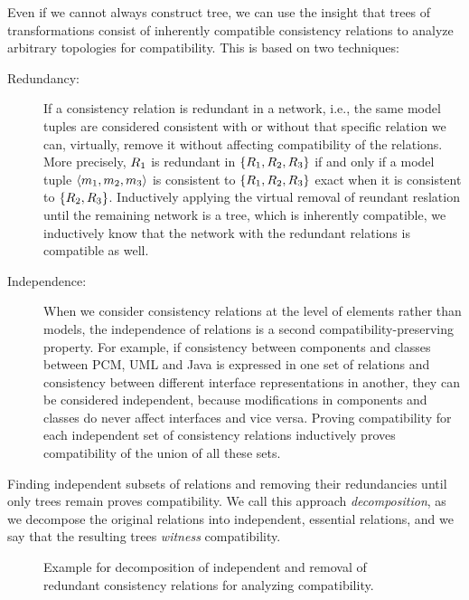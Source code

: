 Even if we cannot always construct tree, we can use the insight that trees of transformations consist of inherently compatible consistency relations to analyze arbitrary topologies for compatibility.
This is based on two techniques:
\begin{description}
    \item[Redundancy:] If a consistency relation is redundant in a network, i.e., the same model tuples are considered consistent with or without that specific relation we can, virtually, remove it without affecting compatibility of the relations. More precisely, $R_{1}$ is redundant in $\{ R_{1}, R_{2}, R_{3} \}$ if and only if a model tuple $\langle m_{1}, m_{2}, m_{3} \rangle$ is consistent to $\{ R_{1}, R_{2}, R_{3} \}$ exact when it is consistent to $\{ R_{2}, R_{3} \}$.
    Inductively applying the virtual removal of reundant reslation until the remaining network is a tree, which is inherently compatible, we inductively know that the network with the redundant relations is compatible as well.
    \item[Independence:] When we consider consistency relations at the level of elements rather than models, the independence of relations is a second compatibility-preserving property.
    For example, if consistency between components and classes between \gls{PCM}, UML and Java is expressed in one set of relations and consistency between different interface representations in another, they can be considered independent, because modifications in components and classes do never affect interfaces and vice versa.
    Proving compatibility for each independent set of consistency relations inductively proves compatibility of the union of all these sets.
\end{description}
Finding independent subsets of relations and removing their redundancies until only trees remain proves compatibility.
We call this approach \emph{decomposition}, as we decompose the original relations into independent, essential relations, and we say that the resulting trees \emph{witness} compatibility.

\begin{figure}
    \centering
    
    \caption[Exemplary overview of compatibility analysis idea]{Example for decomposition of independent and removal of redundant consistency relations for analyzing compatibility.}
    \label{fig:correctness:decomposition}
\end{figure}

